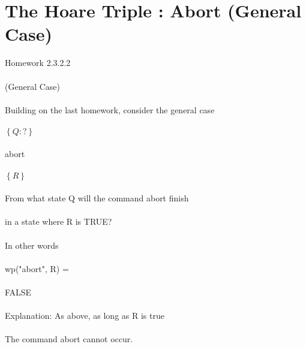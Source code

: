 \documentclass{article}
\begin{document}
\section{The Hoare Triple : Abort (General Case)}
Homework 2.3.2.2
\\
\\
(General Case)
\\
\\
Building on the last homework, consider the general case
\\
\\
$\left\{Q : ? \right\}$
\\
\\
abort
\\
\\
$\left\{R \right\}$
\\
\\
From what state Q will the command abort finish
\\
\\
in a state where R is TRUE?
\\
\\
In other words
\\
\\
wp("abort", R) = 
\\
\\
FALSE
\\
\\
Explanation: As above, as long as R is true
\\
\\
The command abort cannot occur.
 
\end{document}
